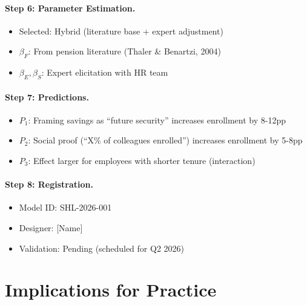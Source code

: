 \paragraph{Step 6: Parameter Estimation.}
\begin{itemize}
\item Selected: Hybrid (literature base + expert adjustment)
\item $\beta_F$: From pension literature (Thaler \& Benartzi, 2004)
\item $\beta_E, \beta_S$: Expert elicitation with HR team
\end{itemize}

\paragraph{Step 7: Predictions.}
\begin{itemize}
\item $P_1$: Framing savings as ``future security'' increases enrollment by 8-12pp
\item $P_2$: Social proof (``X\% of colleagues enrolled'') increases enrollment by 5-8pp
\item $P_3$: Effect larger for employees with shorter tenure (interaction)
\end{itemize}

\paragraph{Step 8: Registration.}
\begin{itemize}
\item Model ID: SHL-2026-001
\item Designer: [Name]
\item Validation: Pending (scheduled for Q2 2026)
\end{itemize}


\section{Implications for Practice}
\label{sec:eee-practice}

